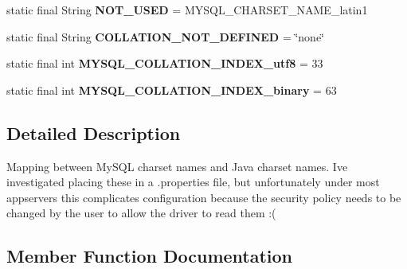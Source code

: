 \begin{DoxyCompactItemize}
static final String {\bfseries N\+O\+T\+\_\+\+U\+S\+ED} = M\+Y\+S\+Q\+L\+\_\+\+C\+H\+A\+R\+S\+E\+T\+\_\+\+N\+A\+M\+E\+\_\+latin1
\item 
\mbox{\label{classcom_1_1mysql_1_1jdbc_1_1_charset_mapping_ab8c8bd2d6e6caea8f2abf202b68f2405}} 
static final String {\bfseries C\+O\+L\+L\+A\+T\+I\+O\+N\+\_\+\+N\+O\+T\+\_\+\+D\+E\+F\+I\+N\+ED} = \char`\"{}none\char`\"{}
\item 
\mbox{\label{classcom_1_1mysql_1_1jdbc_1_1_charset_mapping_a81912e6a76d816951f5b4a397763e7f8}} 
static final int {\bfseries M\+Y\+S\+Q\+L\+\_\+\+C\+O\+L\+L\+A\+T\+I\+O\+N\+\_\+\+I\+N\+D\+E\+X\+\_\+utf8} = 33
\item 
\mbox{\label{classcom_1_1mysql_1_1jdbc_1_1_charset_mapping_aa7031f6d3aa8ca5d204cdfd4a05ddd3e}} 
static final int {\bfseries M\+Y\+S\+Q\+L\+\_\+\+C\+O\+L\+L\+A\+T\+I\+O\+N\+\_\+\+I\+N\+D\+E\+X\+\_\+binary} = 63
\end{DoxyCompactItemize}


\subsection{Detailed Description}
Mapping between My\+S\+QL charset names and Java charset names. I\textquotesingle{}ve investigated placing these in a .properties file, but unfortunately under most appservers this complicates configuration because the security policy needs to be changed by the user to allow the driver to read them \+:( 

\subsection{Member Function Documentation}
\mbox{\label{classcom_1_1mysql_1_1jdbc_1_1_charset_mapping_a1ed354f292dc235b766f7c5fa8b7cff0}} 
